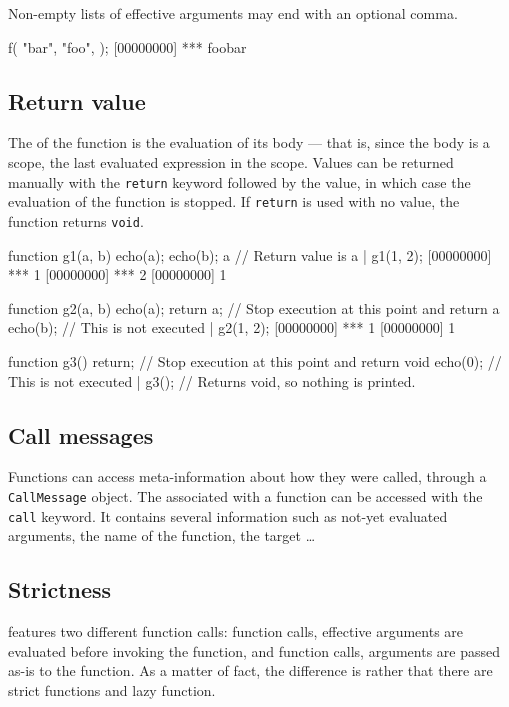 Non-empty lists of effective arguments may end with an optional comma.
\begin{urbiscript}[firstnumber=last]
f(
  "bar",
  "foo",
 );
[00000000] *** foobar
\end{urbiscript}


\subsection{Return value}

The  of the function is the
evaluation of its body --- that is, since the body is a scope, the
last evaluated expression in the scope.  Values can be returned
manually with the \lstinline|return| keyword followed by the value, in
which case the evaluation of the function is stopped. If
\lstinline|return| is used with no value, the function returns
\lstinline|void|.

\begin{urbiscript}[firstnumber=last]
function g1(a, b)
{
  echo(a);
  echo(b);
  a // Return value is a
}|
g1(1, 2);
[00000000] *** 1
[00000000] *** 2
[00000000] 1

function g2(a, b)
{
  echo(a);
  return a; // Stop execution at this point and return a
  echo(b); // This is not executed
}|
g2(1, 2);
[00000000] *** 1
[00000000] 1

function g3()
{
  return; // Stop execution at this point and return void
  echo(0); // This is not executed
}|
g3(); // Returns void, so nothing is printed.
\end{urbiscript}

\subsection{Call messages}
\label{sec:us-fun-callmsg}

Functions can access meta-information about how they were called,
through a \lstinline|CallMessage| object. The 
associated with a function can be accessed with the \lstinline|call|
keyword. It contains several information such as not-yet evaluated
arguments, the name of the function, the target \ldots

\subsection{Strictness}

\us features two different function calls:
 function calls, effective arguments are
evaluated before invoking the function, and 
function calls, arguments are passed as-is to the function.  As a
matter of fact, the difference is rather that there are strict
functions and lazy function.

